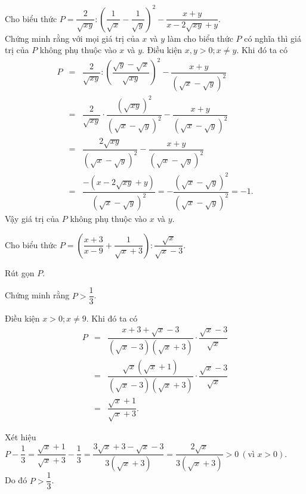 \begin{bt}%
	Cho biểu thức $P=\dfrac{2}{\sqrt{x y}}:\left(\dfrac{1}{\sqrt{x}} - \dfrac{1}{\sqrt{y}}\right)^2 - \dfrac{x + y}{x - 2\sqrt{x y} + y}$.\\ 
	Chứng minh rằng với mọi giá trị của $x$ và $y$ làm cho biểu thức $P$ có nghĩa thì giá trị của $P$ không phụ thuộc vào $x$ và $y$. 
	\loigiai
	{
	Điều kiện $x, y>0 ; x\ne y$. Khi đó ta có
	\allowdisplaybreaks 
	\begin{eqnarray*}
	P&=&\dfrac{2}{\sqrt{x y}}\colon \left(\dfrac{\sqrt{y}-\sqrt{x}}{\sqrt{x y}}\right)^2-\dfrac{x+y}{(\sqrt{x}-\sqrt{y})^2}\\
	&=&\dfrac{2}{\sqrt{x y}}\cdot\dfrac{(\sqrt{x y})^2}{(\sqrt{x}-\sqrt{y})^2}-\dfrac{x+y}{(\sqrt{x}-\sqrt{y})^2}\\
	&=&\dfrac{2\sqrt{x y}}{(\sqrt{x}-\sqrt{y})^2}-\dfrac{x+y}{(\sqrt{x}-\sqrt{y})^2}\\
	&=&\dfrac{-(x-2\sqrt{x y}+y)}{(\sqrt{x}-\sqrt{y})^2}=-\dfrac{(\sqrt{x}-\sqrt{y})^2}{(\sqrt{x}-\sqrt{y})^2}=-1.
	\end{eqnarray*}
	Vậy giá trị của $P$ không phụ thuộc vào $x$ và $y$.
	}
\end{bt}
\begin{bt}%
	Cho biểu thức $P=\left(\dfrac{x + 3}{x - 9} + \dfrac{1}{\sqrt{x} + 3}\right) :\dfrac{\sqrt{x}}{\sqrt{x} - 3}$.
	\begin{listEX}[2]
	\item Rút gọn $P$.
	\item Chứng minh rằng $P>\dfrac{1}{3}$.
	\end{listEX}
	\loigiai
	{
\begin{listEX}
	\item Điều kiện $x>0 ; x\neq 9$. Khi đó ta có
	\allowdisplaybreaks 
	\begin{eqnarray*}
	P&=&\dfrac{x+3+\sqrt{x}-3}{(\sqrt{x}-3)(\sqrt{x}+3)} \cdot \dfrac{\sqrt{x}-3}{\sqrt{x}}\\
	&=&\dfrac{\sqrt{x}(\sqrt{x}+1)}{(\sqrt{x}-3)(\sqrt{x}+3)} \cdot \dfrac{\sqrt{x}-3}{\sqrt{x}}\\
	&=&\dfrac{\sqrt{x}+1}{\sqrt{x}+3}.
	\end{eqnarray*}
	\item Xét hiệu $P - \dfrac{1}{3}=\dfrac{\sqrt{x} + 1}{\sqrt{x} + 3} - \dfrac{1}{3} =\dfrac{3\sqrt{x} + 3 - \sqrt{x} - 3}{3(\sqrt{x} + 3)}=\dfrac{2\sqrt{x}}{3(\sqrt{x} + 3)}>0~(\text{vì }x>0)$.\\ Do đó $P>\dfrac{1}{3}$.
\end{listEX}
	}
\end{bt}
